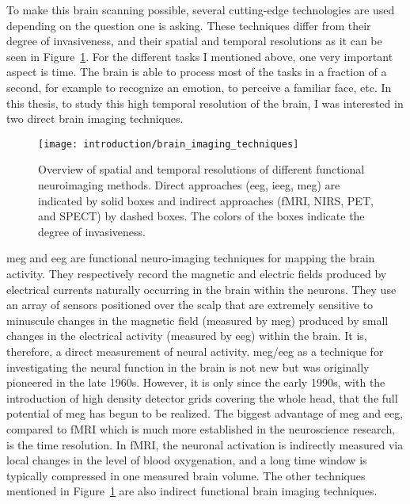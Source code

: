 To make this brain scanning possible, several cutting-edge technologies are used  depending on the question one is asking. These techniques differ from their degree of invasiveness, and their spatial and temporal resolutions as it can be seen in Figure~\ref{fig:brain_imaging_techniques}.
For the different tasks I mentioned above, one very important aspect is time. The brain is able to process most of the tasks in a fraction of a second, for example to recognize an emotion, to perceive a familiar face, etc. In this thesis, to study this high temporal resolution of the brain, I was interested in two direct brain imaging techniques.\\

\begin{figure}
	\texttt{[image: introduction/brain\_imaging\_techniques]}
    \caption{Overview of spatial and temporal resolutions of different functional neuroimaging methods. Direct approaches (\ac{eeg}, i\ac{eeg}, \ac{meg}) are indicated by solid boxes and indirect approaches (\ac{fMRI}, \ac{NIRS}, \ac{PET}, and \ac{SPECT}) by dashed boxes. The colors of the boxes indicate the degree of invasiveness.
    }
    \label{fig:brain_imaging_techniques}
\end{figure}
 
\Ac{meg} and \ac{eeg} are functional neuro-imaging techniques for mapping the brain activity. They respectively record the magnetic and electric fields produced by electrical currents naturally occurring in the brain within the neurons. They use an array of sensors positioned over the scalp that are extremely sensitive to minuscule changes in the magnetic field (measured by \ac{meg}) produced by small changes in the electrical activity (measured by \ac{eeg}) within the brain. It is, therefore, a direct measurement of neural activity. \ac{meg}/\ac{eeg} as a technique for investigating the neural function in the brain is not new but was originally pioneered in the late 1960s. However, it is only since the early 1990s, with the introduction of high density detector grids covering the whole head, that the full potential of \ac{meg} has begun to be realized. The biggest advantage of \ac{meg} and \ac{eeg}, compared to \ac{fMRI} which is much more established in the neuroscience research, is the time resolution. In fMRI, the neuronal activation is indirectly measured via local changes in the level of blood oxygenation, and a long time window is typically compressed in one measured brain volume. The other techniques mentioned in Figure~\ref{fig:brain_imaging_techniques} are also indirect functional brain imaging techniques.\\

